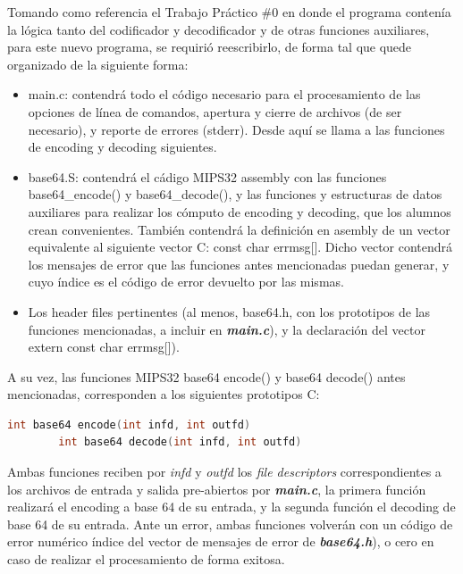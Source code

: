 \documentclass[11pt,a4paper]{article}
\begin{document}
Tomando como referencia el Trabajo Práctico \#0 en donde el programa contenía la lógica tanto del codificador y decodificador y de otras funciones auxiliares, para este nuevo programa, se requirió reescribirlo, de forma tal que quede organizado de la siguiente forma:

\begin{itemize}
	\item{main.c:} contendrá todo el código necesario para el procesamiento de las opciones de línea de comandos, apertura y cierre de archivos (de ser necesario), y reporte de errores (stderr). Desde aquí se llama a las funciones de encoding y decoding siguientes.
	\item {base64.S:} contendrá el cádigo MIPS32 assembly con las funciones base64\_encode() y base64\_decode(), y las funciones y estructuras de datos auxiliares para realizar los cómputo de encoding y decoding, que
los alumnos crean convenientes. También contendrá la definición en asembly de un vector equivalente al siguiente vector C: const char\* errmsg[]. Dicho vector contendrá los mensajes de error que las funciones antes mencionadas puedan generar, y cuyo índice es el código de error devuelto por las mismas.
	\item{Los header files pertinentes} (al menos, base64.h, con los prototipos de las funciones mencionadas, a incluir en \textit{\textbf{main.c}}), y la declaración del vector extern const char\* errmsg[]).

\end{itemize}

A su vez, las funciones MIPS32 base64 encode() y base64 decode() antes mencionadas, corresponden a los siguientes prototipos C:

	\begin{lstlisting}[language=C]
		int base64 encode(int infd, int outfd)
		int base64 decode(int infd, int outfd)
	\end{lstlisting}

Ambas funciones reciben por \textit{infd} y \textit{outfd} los \textit{file descriptors} correspondientes a los archivos de entrada y salida pre-abiertos por \textit{\textbf{main.c}}, la primera función realizará el encoding a base 64 de su entrada, y la segunda función el decoding de base 64 de su entrada.
Ante un error, ambas funciones volverán con un código de error numérico índice del vector de mensajes de error de \textit{\textbf{base64.h}}), o cero en caso de realizar el procesamiento de forma exitosa.
\end{document}
